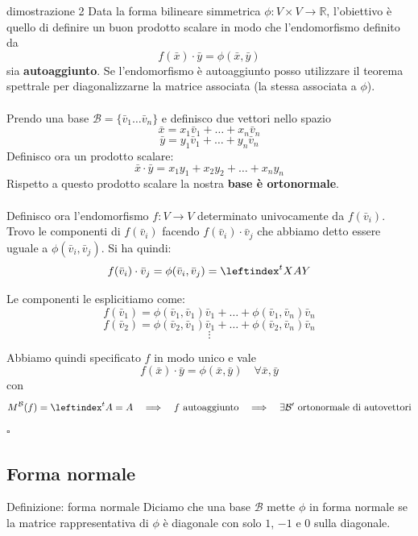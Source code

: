 \documentclass[x11names]{article}
\newcommand*{\QEDB}{\null\nobreak\hfill\ensuremath{\square}}%
\begin{document}
\begin{es}{dimostrazione 2}
	Data la forma bilineare simmetrica $\phi : V \times V \to \mathbb{R}$, l'obiettivo è quello di definire un buon prodotto scalare in modo che  l'endomorfismo definito da
	\[
	f(\bar{x}) \cdot \bar{y} = \phi(\bar{x},\bar{y})
	\]
	sia \textbf{autoaggiunto}. Se l'endomorfismo è autoaggiunto posso utilizzare il teorema spettrale per diagonalizzarne la matrice associata (la stessa associata a $\phi$). \\ \\
	
	\noindent
	Prendo una base $\mathcal{B} = \{\bar{v}_{1} \dots \bar{v}_{n}\}$ e definisco due vettori nello spazio
	\[
	\bar{x} = x_{1}\bar{v}_{1}+ \dots +x_{n}\bar{v}_{n}
	\]
	\[
	\bar{y} = y_{1}\bar{v}_{1}+ \dots +y_{n}\bar{v}_{n}
	\]
	Definisco ora un prodotto scalare:
	\[
	\bar{x} \cdot \bar{y} = x_{1}y_{1} + x_{2}y_{2} + \dots + x_{n}y_{n}
	\]
	Rispetto a questo prodotto scalare la nostra \textbf{base è ortonormale}. \\ \\
	
	
	\noindent
	Definisco ora l'endomorfismo $f:V\to V$ determinato univocamente da $f(\bar{v}_{i})$. Trovo le componenti di $f(\bar{v}_{i})$  facendo $f(\bar{v}_{i}) \cdot \bar{v}_{j}$ che abbiamo detto essere uguale a $\phi (\bar{v}_{i}, \bar{v}_{j})$. Si ha quindi:
	\[
	f(\bar{v}_{i})\cdot \bar{v}_{j} = \phi (\bar{v}_{i},\bar{v}_{j}) = \leftindex^{t}{X}AY
	\]

	Le componenti le esplicitiamo come:
	\[
	f(\bar{v}_{1})  = \phi(\bar{v}_{1},\bar{v}_{1}) \bar{v}_{1} + \dots + \phi(\bar{v}_{1},\bar{v}_{n})\bar{v}_{n}
	\]
	\[
	f(\bar{v}_{2})  = \phi(\bar{v}_{2},\bar{v}_{1}) \bar{v}_{1} + \dots + \phi(\bar{v}_{2},\bar{v}_{n})\bar{v}_{n}
	\]
	\[
	\vdots
	\]
\end{es}
\begin{es}{}
	Abbiamo quindi specificato $f$ in modo unico e vale
	\[
	f(\bar{x})\cdot \bar{y} = \phi(\bar{x},\bar{y}) \quad \forall \bar{x},\bar{y} 
	\]
	con
	\[
	M^\mathcal{B}(f) = \leftindex^{t}{A} = A \quad \Longrightarrow \quad f \text{ autoaggiunto} \quad \Longrightarrow \quad \exists \mathcal{B}' \text{ ortonormale di autovettori}
	\] \QEDB
\end{es}

\subsection{Forma normale}
	\begin{center}
	\colorbox{myblue}{\begin{minipage}{5.75in}
			\begin{blues}{Definizione: forma normale}
			Diciamo  che una base $\mathcal{B}$ mette $\phi$ in forma normale se la matrice rappresentativa di $\phi$ è diagonale con solo $1$, $-1$ e $0$ sulla diagonale.
				
			\end{blues}
	\end{minipage}}       
\end{center}
\end{document}
